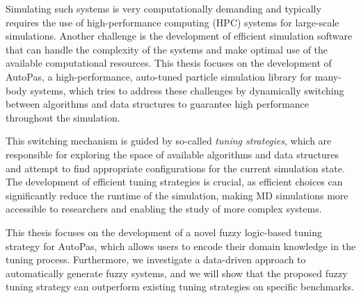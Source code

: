 Simulating such systems is very computationally demanding and typically requires the use of high-performance computing (HPC) systems for large-scale simulations. Another challenge is the development of efficient simulation software that can handle the complexity of the systems and make optimal use of the available computational resources. This thesis focuses on the development of AutoPas, a high-performance, auto-tuned particle simulation library for many-body systems, which tries to address these challenges by dynamically switching between algorithms and data structures to guarantee high performance throughout the simulation.

This switching mechanism is guided by so-called \textit{tuning strategies}, which are responsible for exploring the space of available algorithms and data structures and attempt to find appropriate configurations for the current simulation state. The development of efficient tuning strategies is crucial, as efficient choices can significantly reduce the runtime of the simulation, making MD simulations more accessible to researchers and enabling the study of more complex systems.

This thesis focuses on the development of a novel fuzzy logic-based tuning strategy for AutoPas, which allows users to encode their domain knowledge in the tuning process. Furthermore, we investigate a data-driven approach to automatically generate fuzzy systems, and we will show that the proposed fuzzy tuning strategy can outperform existing tuning strategies on specific benchmarks.